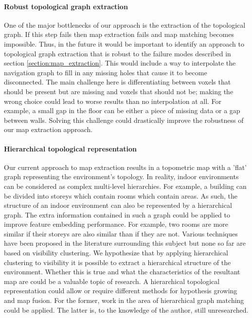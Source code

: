 \paragraph{Robust topological graph extraction}
One of the major bottlenecks of our approach is the extraction of the topological graph. If this step fails then map extraction fails and map matching becomes impossible. Thus, in the future it would be important to identify an approach to topological graph extraction that is robust to the failure modes described in section \ref{section:map_extraction}. This would include a way to interpolate the navigation graph to fill in any missing holes that cause it to become disconnected.  The main challenge here is differentiating between voxels that should be present but are missing and voxels that should not be; making the wrong choice could lead to worse results than no interpolation at all. For example, a small gap in the floor can be either a piece of missing data or a gap between walls. Solving this challenge could drastically improve the robustness of our map extraction approach.

\paragraph{Hierarchical topological representation}
Our current approach to map extraction results in a topometric map with a 'flat' graph representing the environment's topology. In reality, indoor environments can be considered as complex multi-level hierarchies. For example, a building can be divided into storeys which contain rooms which contain areas. As such, the structure of an indoor environment can also be represented by a hierarchical graph. The extra information contained in such a graph could be applied to improve feature embedding performance. For example, two rooms are more similar if their storeys are also similar than if they are not. Various techniques have been proposed in the literature surrounding this subject but none so far are based on visibility clustering. We hypothesize that by applying hierarchical clustering to visibility it is possible to extract a hierarchical structure of the environment. Whether this is true and what the characteristics of the resultant map are could be a valuable topic of research. A hierarchical topological representation could allow or require different methods for hypothesis growing and map fusion. For the former, work in the area of hierarchical graph matching could be applied. The latter is, to the knowledge of the author, still unresearched. 

